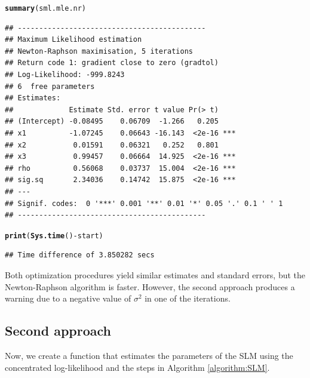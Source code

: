 \documentclass[english,12pt]{book}\usepackage[]{graphicx}\usepackage[]{xcolor}
\makeatletter
\newcommand{\hlopt}[1]{\textcolor[rgb]{0,0,0}{#1}}%
\newcommand{\hldef}[1]{\textcolor[rgb]{0.345,0.345,0.345}{#1}}%
\newcommand{\hlkwd}[1]{\textcolor[rgb]{0.737,0.353,0.396}{\textbf{#1}}}%
\newenvironment{kframe}{%
 \def\at@end@of@kframe{}%
 \ifinner\ifhmode%
  \def\at@end@of@kframe{\end{minipage}}%
  \begin{minipage}{\columnwidth}%
 \fi\fi%
 \def\FrameCommand##1{\hskip\@totalleftmargin \hskip-\fboxsep
 \colorbox{shadecolor}{##1}\hskip-\fboxsep
     \hskip-\linewidth \hskip-\@totalleftmargin \hskip\columnwidth}%
 \MakeFramed {\advance\hsize-\width
   \@totalleftmargin\z@ \linewidth\hsize
   \@setminipage}}%
 {\par\unskip\endMakeFramed%
 \at@end@of@kframe}
\newenvironment{knitrout}{}{} %
\let\hlstd\hldef
\makeatother
\begin{document}
\begin{knitrout}
\begin{kframe}
{\ttfamily\noindent\color{warningcolor}{\#\# Warning in log(2 * pi * sig.sq): NaNs produced}}\begin{alltt}
\hlkwd{summary}\hlstd{(sml.mle.nr)}
\end{alltt}
\begin{verbatim}
## --------------------------------------------
## Maximum Likelihood estimation
## Newton-Raphson maximisation, 5 iterations
## Return code 1: gradient close to zero (gradtol)
## Log-Likelihood: -999.8243 
## 6  free parameters
## Estimates:
##             Estimate Std. error t value Pr(> t)    
## (Intercept) -0.08495    0.06709  -1.266   0.205    
## x1          -1.07245    0.06643 -16.143  <2e-16 ***
## x2           0.01591    0.06321   0.252   0.801    
## x3           0.99457    0.06664  14.925  <2e-16 ***
## rho          0.56068    0.03737  15.004  <2e-16 ***
## sig.sq       2.34036    0.14742  15.875  <2e-16 ***
## ---
## Signif. codes:  0 '***' 0.001 '**' 0.01 '*' 0.05 '.' 0.1 ' ' 1
## --------------------------------------------
\end{verbatim}
\begin{alltt}
\hlkwd{print}\hlstd{(}\hlkwd{Sys.time}\hlstd{()}\hlopt{-} \hlstd{start)}
\end{alltt}
\begin{verbatim}
## Time difference of 3.850282 secs
\end{verbatim}
\end{kframe}
\end{knitrout}

Both optimization procedures yield similar estimates and standard errors, but the Newton-Raphson algorithm is faster. However, the second approach produces a warning due to a negative value of $\sigma^2$ in one of the iterations.

\subsection{Second approach}\label{sec:code-condentrated-slm}

Now, we create a function that estimates the parameters of the SLM using the concentrated log-likelihood and  the steps in Algorithm \eqref{algorithm:SLM}.
\end{document}
